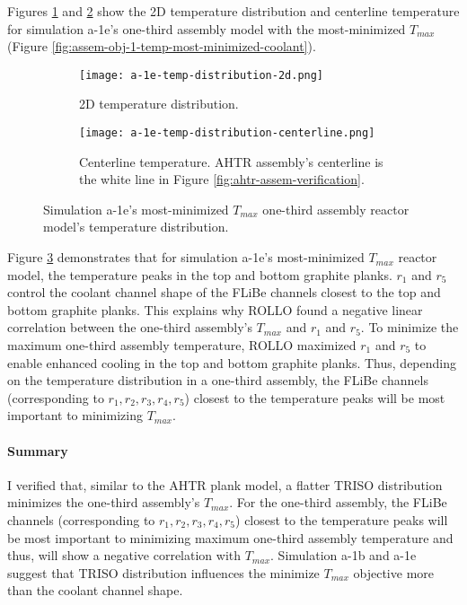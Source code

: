 Figures \ref{fig:a-1e-temp-distribution-2d} and \ref{fig:a-1e-temp-distribution-centerline}
show the 2D temperature distribution and centerline temperature for simulation a-1e's 
one-third assembly model with the most-minimized $T_{max}$ (Figure 
\ref{fig:assem-obj-1-temp-most-minimized-coolant}). 
\begin{figure}[htbp!]
    \begin{subfigure}{\textwidth}
        \centering
        \texttt{[image: a-1e-temp-distribution-2d.png]}
        \caption{2D temperature distribution.}
        \label{fig:a-1e-temp-distribution-2d} 
    \end{subfigure}
    \begin{subfigure}{\textwidth}
        \centering
        \texttt{[image: a-1e-temp-distribution-centerline.png]}
        \caption{Centerline temperature. AHTR assembly's centerline is the white line 
        in Figure \ref{fig:ahtr-assem-verification}.}
        \label{fig:a-1e-temp-distribution-centerline} 
    \end{subfigure}
    \caption{Simulation a-1e's most-minimized $T_{max}$ one-third assembly reactor 
    model's temperature distribution.}
    \label{fig:a-1e-temp-distribution}
\end{figure}
Figure \ref{fig:a-1e-temp-distribution} demonstrates that for simulation a-1e's 
most-minimized $T_{max}$ reactor model, the temperature peaks in the top and bottom 
graphite planks. 
$r_1$ and $r_5$ control the coolant channel shape of the \gls{FLiBe} channels closest 
to the top and bottom graphite planks. 
This explains why \gls{ROLLO} found a negative linear correlation 
between the one-third assembly's $T_{max}$ and $r_1$ and $r_5$. 
To minimize the maximum one-third assembly temperature, \gls{ROLLO} maximized
$r_1$ and $r_5$ to enable enhanced cooling in the top and bottom graphite planks. 
Thus, depending on the temperature distribution in a one-third assembly, the \gls{FLiBe} 
channels (corresponding to $r_1, r_2, r_3, r_4, r_5$) closest to the temperature peaks 
will be most important to minimizing $T_{max}$. 

\paragraph{Summary}
I verified that, similar to the \gls{AHTR} plank model, a flatter TRISO distribution 
minimizes the one-third assembly's $T_{max}$. 
For the one-third assembly, the FLiBe channels (corresponding to $r_1, r_2, r_3, r_4, 
r_5$) closest to the temperature peaks will be most important to minimizing maximum
one-third assembly temperature and thus, will show a negative correlation with 
$T_{max}$. 
Simulation a-1b and a-1e suggest that TRISO distribution influences the minimize 
$T_{max}$ objective more than the coolant channel shape.

